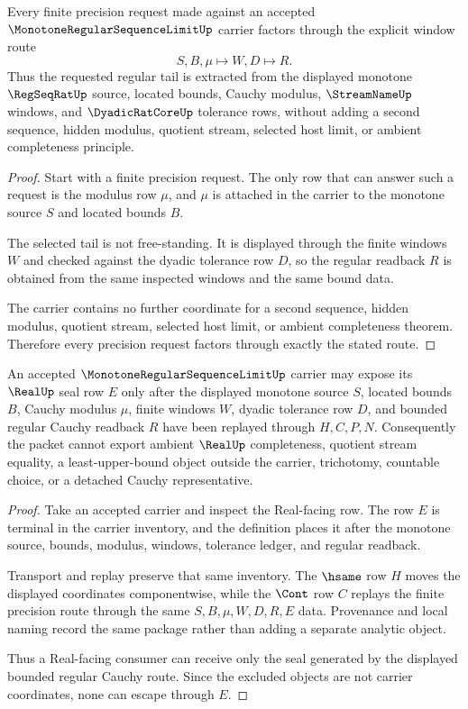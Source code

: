 \begin{theorem}
\label{thm:monotone-regular-sequence-limit-window-extraction}
Every finite precision request made against an accepted $\MonotoneRegularSequenceLimitUp$ carrier factors through the explicit window route
$$
S,B,\mu \longmapsto W,D \longmapsto R .
$$
Thus the requested regular tail is extracted from the displayed monotone $\RegSeqRatUp$ source, located bounds, Cauchy modulus, $\StreamNameUp$ windows, and $\DyadicRatCoreUp$ tolerance rows, without adding a second sequence, hidden modulus, quotient stream, selected host limit, or ambient completeness principle.
\end{theorem}
\begin{proof}
Start with a finite precision request. The only row that can answer such a request is the modulus row $\mu$, and $\mu$ is attached in the carrier to the monotone source $S$ and located bounds $B$.

The selected tail is not free-standing. It is displayed through the finite windows $W$ and checked against the dyadic tolerance row $D$, so the regular readback $R$ is obtained from the same inspected windows and the same bound data.

The carrier contains no further coordinate for a second sequence, hidden modulus, quotient stream, selected host limit, or ambient completeness theorem. Therefore every precision request factors through exactly the stated route.
\end{proof}

\begin{theorem}
\label{thm:monotone-regular-sequence-limit-real-seal-nonescape}
An accepted $\MonotoneRegularSequenceLimitUp$ carrier may expose its $\RealUp$ seal row $E$ only after the displayed monotone source $S$, located bounds $B$, Cauchy modulus $\mu$, finite windows $W$, dyadic tolerance row $D$, and bounded regular Cauchy readback $R$ have been replayed through $H,C,P,N$. Consequently the packet cannot export ambient $\RealUp$ completeness, quotient stream equality, a least-upper-bound object outside the carrier, trichotomy, countable choice, or a detached Cauchy representative.
\end{theorem}
\begin{proof}
Take an accepted carrier and inspect the Real-facing row. The row $E$ is terminal in the carrier inventory, and the definition places it after the monotone source, bounds, modulus, windows, tolerance ledger, and regular readback.

Transport and replay preserve that same inventory. The $\hsame$ row $H$ moves the displayed coordinates componentwise, while the $\Cont$ row $C$ replays the finite precision route through the same $S,B,\mu,W,D,R,E$ data. Provenance and local naming record the same package rather than adding a separate analytic object.

Thus a Real-facing consumer can receive only the seal generated by the displayed bounded regular Cauchy route. Since the excluded objects are not carrier coordinates, none can escape through $E$.
\end{proof}

